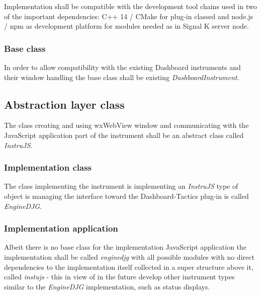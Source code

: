 \documentclass[11pt]{article}
\begin{document}
    Implementation shall be compatible with the development tool chains used
in two of the important dependencies: C++ 14 / CMake for plug-in classed
and node.js / npm as development platform for modules needed as in
Signal K server node.

    \hypertarget{base-class}{%
\subsubsection{Base class}\label{base-class}}

    In order to allow compatibility with the existing Dashboard instruments
and their window handling the base class shall be existing
\emph{DashboardInstrument}.

    \hypertarget{abstraction-layer-class}{%
\subsection{Abstraction layer class}\label{abstraction-layer-class}}

    The class creating and using wxWebView window and communicating with the
JavaScript application part of the instrument shall be an abstract class
called \emph{InstruJS}.

    \hypertarget{implementation-class}{%
\subsubsection{Implementation class}\label{implementation-class}}

    The class implementing the instrument is implementing an \emph{InstruJS}
type of object is managing the interface toward the Dashboard-Tactics
plug-in is called \emph{EngineDJG}.

    \hypertarget{implementation-application}{%
\subsubsection{Implementation
application}\label{implementation-application}}

    Albeit there is no base class for the implementation JavaScript
application the implementation shall be called \emph{enginedjg} with all
possible modules with no direct dependencies to the implementation
itself collected in a super structure above it, called \emph{instujs} -
this in view of in the future develop other instrument types similar to
the \emph{EngineDJG} implementation, such as status displays.
\end{document}

